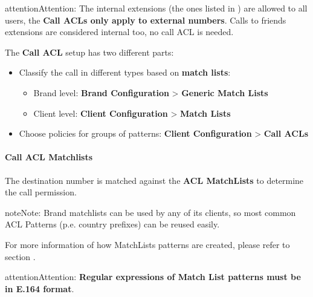 \documentclass[letterpaper,10pt,english]{sphinxmanual}
\begin{document}
\begin{notice}{attention}{Attention:}
The internal extensions (the ones listed in {\hyperref[administration_portal/client/vpbx/extensions:extensions]{}}) are allowed to all users, the \textbf{Call
ACLs only apply to external numbers}. Calls to friends extensions are considered internal too, no call ACL is needed.
\end{notice}

The \textbf{Call ACL} setup has two different parts:
\begin{itemize}
\item {} 
Classify the call in different types based on \textbf{match lists}:
\begin{itemize}
\item {} 
Brand level: \textbf{Brand Configuration} \textgreater{} \textbf{Generic Match Lists}

\item {} 
Client level: \textbf{Client Configuration} \textgreater{} \textbf{Match Lists}

\end{itemize}

\item {} 
Choose policies for groups of patterns: \textbf{Client Configuration} \textgreater{} \textbf{Call
ACLs}

\end{itemize}


\paragraph{Call ACL Matchlists}
\label{administration_portal/client/vpbx/user_configuration/call_acls:call-acl-matchlists}
The destination number is matched against the \textbf{ACL MatchLists} to determine
the call permission.

\begin{notice}{note}{Note:}
Brand matchlists can be used by any of its clients, so most common
ACL Patterns (p.e. country prefixes) can be reused easily.
\end{notice}

For more information of how MatchLists patterns are created, please refer to section
{\hyperref[administration_portal/client/vpbx/routing_tools/match_lists:match\string-lists]{}}.

\begin{notice}{attention}{Attention:}
\textbf{Regular expressions of Match List patterns must be in E.164 format}.
\end{notice}
\end{document}

